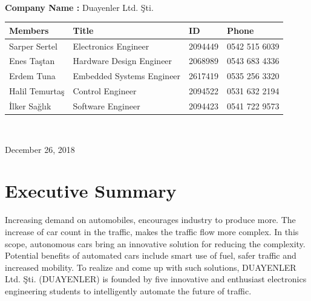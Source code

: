 \documentclass[a4paper,12pt]{article}
\begin{document}
\begin{titlepage}
\begin{minipage}[r]{0.35\textwidth}
\end{minipage}\\[1cm]
\begin{minipage}{\textwidth}
	\begin{flushleft}
		\large{\textbf{Company Name :}}	Duayenler Ltd. Şti.\\
		\begin{table}[H]
			\begin{tabular}{l l l l}
				\hline
				\textbf{Members}&\textbf{Title}& \textbf{ID}&\textbf{Phone} \\ \hline
				Sarper Sertel & Electronics Engineer& 2094449 & 0542 515 6039  \\ 
				Enes Taştan & Hardware Design Engineer & 2068989 & 0543 683 4336  \\ 
				Erdem Tuna & Embedded Systems Engineer& 2617419 & 0535 256 3320  \\ 
				Halil Temurtaş & Control Engineer& 2094522 & 0531 632 2194  \\
				İlker Sağlık & Software Engineer& 2094423 & 0541 722 9573  \\ \hline
				
				
			\end{tabular}
		\end{table}
	\end{flushleft}
\end{minipage}\\[1cm]

\begin{flushbottom}
{\large December 26, 2018} %
\end{flushbottom}

\end{titlepage}

\blankpage
\tableofcontents
\newpage

\section{Executive Summary}

	Increasing demand on automobiles, encourages industry to produce more. The increase of car count in the traffic, makes the traffic flow more complex. In this scope, autonomous cars bring an innovative solution for reducing the complexity. Potential benefits of automated cars include smart use of fuel, safer traffic and increased mobility. To realize and come up with such solutions, DUAYENLER Ltd. Şti. (DUAYENLER) is founded by five innovative and enthusiast electronics engineering students to intelligently automate the future of traffic.\\
	
\end{document}
